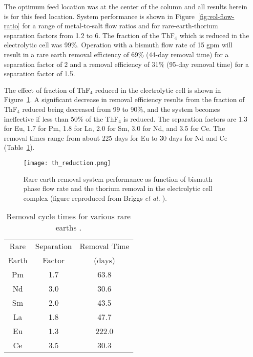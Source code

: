 The optimum feed location was at the center of the column and all results herein is for this feed
location. System performance is shown in Figure~\ref{fig:vol-flow-ratio} for a range of metal-to-salt flow ratios and for rare-earth-thorium separation factors from 1.2 to 6. The fraction of the ThF$_4$ which is reduced in the electrolytic cell was 99\%. Operation with a bismuth flow rate of 15 gpm will result in a rare earth removal efficiency of 69\% (44-day removal time) for a separation factor of 2 and a removal efficiency of 31\% (95-day removal time) for a separation factor of 1.5.

The effect of fraction of ThF$_4$ reduced in the electrolytic cell is shown in Figure~\ref{fig:th-reduction}. A significant decrease in removal efficiency results from the fraction of ThF$_4$ reduced being decreased from 99 to 90\%, and the system becomes ineffective if less than 50\% of the ThF$_4$ is reduced.  The separation factors are 1.3 for Eu, 1.7 for Pm, 1.8 for La, 2.0 for Sm, 3.0 for Nd, and 3.5 for Ce. The removal times range from about 225 days for Eu to 30 days for Nd and Ce (Table~\ref{tab:removal_time}). 
\begin{figure}[htbp!]
  \centering
        \texttt{[image: th\_reduction.png]}
    \caption{Rare earth removal system performance as function of bismuth phase flow rate and the thorium removal in the electrolytic cell complex (figure reproduced from Briggs \emph{et al.} \cite{briggs_molten-salt_1969}).}
    \label{fig:th-reduction}
\end{figure}
\begin{table}[ht!]
\caption{Removal cycle times for various rare earths \cite{briggs_molten-salt_1969}.}
  \centering
\begin{tabular}{c c c}
\hline Rare  & Separation & Removal Time                        \\
       Earth & Factor     & (days)								\\
\hline Pm          & 1.7				& 63.8 					\\
\hline Nd		   & 3.0                & 30.6 					\\
\hline Sm		   & 2.0                & 43.5 					\\
\hline La		   & 1.8                & 47.7 					\\
\hline Eu		   & 1.3                & 222.0 				\\
\hline Ce		   & 3.5                & 30.3 					\\
\hline 
\end{tabular}
  		\label{tab:removal_time}
\end{table}

